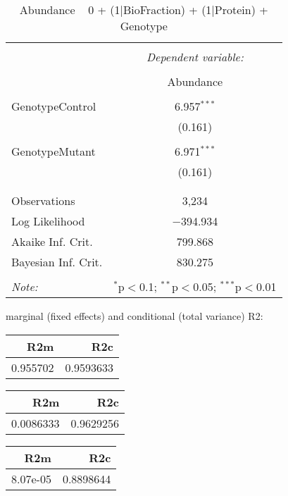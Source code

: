 \documentclass[11pt]{report}
\begin{document}
\begin{table}[!htbp] \centering 
  \caption{Abundance ~ 0 + (1|BioFraction) + (1|Protein) + Genotype} 
  \label{} 
\begin{tabular}{@{\extracolsep{5pt}}lc} 
\\[-1.8ex]\hline 
\hline \\[-1.8ex] 
 & \multicolumn{1}{c}{\textit{Dependent variable:}} \\ 
\cline{2-2} 
\\[-1.8ex] & Abundance \\ 
\hline \\[-1.8ex] 
 GenotypeControl & 6.957$^{***}$ \\ 
  & (0.161) \\ 
  & \\ 
 GenotypeMutant & 6.971$^{***}$ \\ 
  & (0.161) \\ 
  & \\ 
\hline \\[-1.8ex] 
Observations & 3,234 \\ 
Log Likelihood & $-$394.934 \\ 
Akaike Inf. Crit. & 799.868 \\ 
Bayesian Inf. Crit. & 830.275 \\ 
\hline 
\hline \\[-1.8ex] 
\textit{Note:}  & \multicolumn{1}{r}{$^{*}$p$<$0.1; $^{**}$p$<$0.05; $^{***}$p$<$0.01} \\ 
\end{tabular} 
\end{table} 
marginal (fixed effects) and conditional (total variance) R2:

\begin{tabular}{r|r}
\hline
R2m & R2c\\
\hline
0.955702 & 0.9593633\\
\hline
\end{tabular}

\begin{tabular}{r|r}
\hline
R2m & R2c\\
\hline
0.0086333 & 0.9629256\\
\hline
\end{tabular}

\begin{tabular}{r|r}
\hline
R2m & R2c\\
\hline
8.07e-05 & 0.8898644\\
\hline
\end{tabular}
\end{document}
